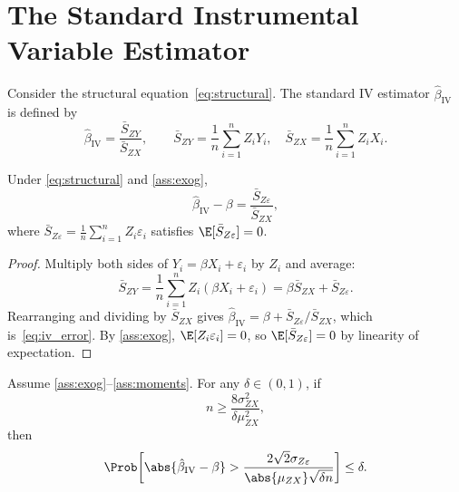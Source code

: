 \section{The Standard Instrumental Variable Estimator}
\label{sec:standard_iv}

\begin{definition}
    Consider the structural equation~\eqref{eq:structural}. The standard IV estimator
    $\hat{\beta}_{\mathrm{IV}}$ is defined by
    \[
        \hat{\beta}_{\mathrm{IV}} = \frac{\bar{S}_{ZY}}{\bar{S}_{ZX}},
        \qquad
        \bar{S}_{ZY} = \frac{1}{n}\sum_{i=1}^{n}Z_iY_i,
        \quad
        \bar{S}_{ZX} = \frac{1}{n}\sum_{i=1}^{n}Z_iX_i.
    \]
\end{definition}

\begin{lemma}
    \label{lem:iv_decomp}
    Under \eqref{eq:structural} and \ref{ass:exog},
    \begin{equation}
    \label{eq:iv_error}
        \hat{\beta}_{\mathrm{IV}} - \beta = \frac{\bar{S}_{Z\varepsilon}}{\bar{S}_{ZX}},
    \end{equation}
    where $\bar{S}_{Z\varepsilon} = \frac{1}{n}\sum_{i=1}^{n}Z_i\varepsilon_i$
    satisfies $\E[\bar{S}_{Z\varepsilon}] = 0$.
\end{lemma}

\begin{proof}
    Multiply both sides of $Y_i = \beta X_i + \varepsilon_i$ by $Z_i$ and average:
    \[
        \bar{S}_{ZY}
        = \frac{1}{n}\sum_{i=1}^{n}Z_i(\beta X_i + \varepsilon_i)
        = \beta\bar{S}_{ZX} + \bar{S}_{Z\varepsilon}.
    \]
    Rearranging and dividing by $\bar{S}_{ZX}$ gives $\hat{\beta}_{\mathrm{IV}} = \beta + \bar{S}_{Z\varepsilon}/\bar{S}_{ZX}$, which is~\eqref{eq:iv_error}. By \ref{ass:exog}, $\E[Z_i\varepsilon_i] = 0$, so $\E[\bar{S}_{Z\varepsilon}] = 0$ by linearity of expectation.
\end{proof}

\begin{theorem}
\label{thm:iv}
    Assume \ref{ass:exog}--\ref{ass:moments}. For any $\delta \in (0,1)$, if
    \begin{equation}
        \label{eq:iv_strength}
            n \geq \frac{8\sigma_{ZX}^2}{\delta \mu_{ZX}^2},
    \end{equation}
    then
    \begin{equation}
    \label{eq:iv_bound}
        \Prob\!\left[\abs{\hat{\beta}_{\mathrm{IV}} - \beta}
            > \frac{2\sqrt{2}\sigma_{Z\varepsilon}}{\abs{\mu_{ZX}}\sqrt{\delta n}}
            \right] \leq \delta.
    \end{equation}
\end{theorem}

